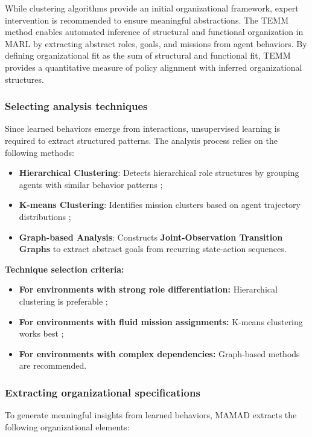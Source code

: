 \documentclass[pdflatex,sn-mathphys-num]{sn-jnl}%
\theoremstyle{thmstyleone}%
\theoremstyle{thmstyletwo}%
\theoremstyle{thmstylethree}%
\begin{document}
While clustering algorithms provide an initial organizational framework, expert intervention is recommended to ensure meaningful abstractions. The TEMM method enables automated inference of structural and functional organization in MARL by extracting abstract roles, goals, and missions from agent behaviors. By defining organizational fit as the sum of structural and functional fit, TEMM provides a quantitative measure of policy alignment with inferred organizational structures.

\subsubsection{Selecting analysis techniques}
Since learned behaviors emerge from interactions, unsupervised learning is required to extract structured patterns. The analysis process relies on the following methods:

\begin{itemize}
    \item \textbf{Hierarchical Clustering}: Detects hierarchical role structures by grouping agents with similar behavior patterns ;
    \item \textbf{K-means Clustering}: Identifies mission clusters based on agent trajectory distributions ;
    \item \textbf{Graph-based Analysis}: Constructs \textbf{Joint-Observation Transition Graphs} to extract abstract goals from recurring state-action sequences.
\end{itemize}

\noindent \textbf{Technique selection criteria:}
\begin{itemize}
    \item \textbf{For environments with strong role differentiation:} Hierarchical clustering is preferable ;
    \item \textbf{For environments with fluid mission assignments:} K-means clustering works best ;
    \item \textbf{For environments with complex dependencies:} Graph-based methods are recommended.
\end{itemize}

\subsubsection{Extracting organizational specifications}
To generate meaningful insights from learned behaviors, MAMAD extracts the following organizational elements:
\end{document}
